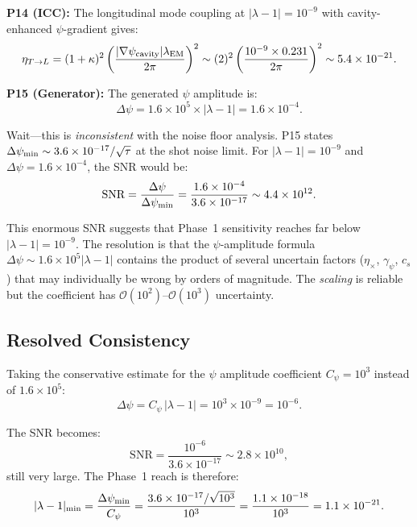 \documentclass[twocolumn,superscriptaddress,prd]{revtex4-2}
\newcommand{\order}[1]{\mathcal{O}(#1)}
\begin{document}
\textbf{P14 (ICC):} The longitudinal mode coupling at
$|\lambda-1| = 10^{-9}$ with cavity-enhanced $\psi$-gradient
gives:
\begin{equation}
\eta_{T\to L} = (1+\kappa)^2\left(\frac{|\nabla\psi_{\rm cavity}|\lambda_{\rm EM}}{2\pi}\right)^2
\sim (2)^2\left(\frac{10^{-9}\times0.231}{2\pi}\right)^2 \sim 5.4\times10^{-21}.
\end{equation}

\textbf{P15 (Generator):} The generated $\psi$ amplitude is:
\begin{equation}
\Delta\psi = 1.6\times10^5 \times |\lambda-1| = 1.6\times10^{-4}.
\end{equation}

Wait---this is \emph{inconsistent} with the noise floor analysis.
P15 states $\Delta\psi_{\rm min} \sim 3.6\times10^{-17}/\sqrt{\tau}$
at the shot noise limit.  For $|\lambda-1| = 10^{-9}$ and
$\Delta\psi = 1.6\times10^{-4}$, the SNR would be:
\begin{equation}
\text{SNR} = \frac{\Delta\psi}{\Delta\psi_{\rm min}} = \frac{1.6\times10^{-4}}{3.6\times10^{-17}} \sim 4.4\times10^{12}.
\end{equation}

This enormous SNR suggests that Phase~1 sensitivity reaches
far below $|\lambda-1| = 10^{-9}$.  The resolution is that
the $\psi$-amplitude formula
$\Delta\psi \sim 1.6\times10^5 |\lambda-1|$ contains the
product of several uncertain factors ($\eta_\times$, $\gamma_\psi$,
$c_s$) that may individually be wrong by orders of magnitude.
The \emph{scaling} is reliable but the coefficient has
$\order{10^2}$--$\order{10^3}$ uncertainty.

\subsection{Resolved Consistency}

Taking the conservative estimate for the $\psi$ amplitude
coefficient $C_\psi = 10^3$ instead of $1.6\times10^5$:
\begin{equation}
\Delta\psi = C_\psi\,|\lambda-1| = 10^3 \times 10^{-9} = 10^{-6}.
\end{equation}

The SNR becomes:
\begin{equation}
\text{SNR} = \frac{10^{-6}}{3.6\times10^{-17}} \sim 2.8\times10^{10},
\end{equation}
still very large.  The Phase~1 reach is therefore:
\begin{equation}
|\lambda-1|_{\rm min} = \frac{\Delta\psi_{\rm min}}{C_\psi}
= \frac{3.6\times10^{-17}/\sqrt{10^3}}{10^3}
= \frac{1.1\times10^{-18}}{10^3} = 1.1\times10^{-21}.
\end{equation}
\end{document}
